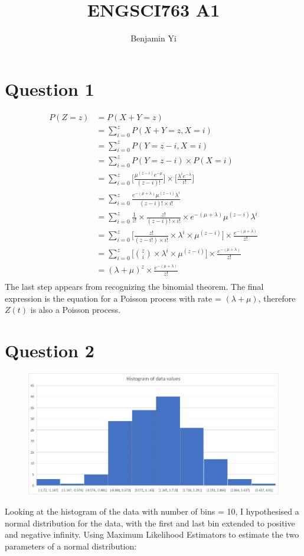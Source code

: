 \documentclass[10pt,a4paper]{article}
\begin{document}
\title{ENGSCI763 A1}
\author{Benjamin Yi}
	
\section*{Question 1}
\begin{align*}
	P(Z=z) &= P(X + Y = z) \\
	&= \sum_{i=0}^{z}P(X + Y = z, X = i) \\
	&= \sum_{i=0}^{z}P(Y = z - i, X = i) \\
	&= \sum_{i=0}^{z}P(Y = z - i) \times P(X = i) \\
	&= \sum_{i=0}^{z}\bigg[\frac{\mu^{(z-i)}e^{-\mu}}{(z-i)!}\bigg]\times\bigg[\frac{\lambda^ie^{-\lambda}}{i!}\bigg]\\
	&= \sum_{i=0}^{z}\frac{e^{-(\mu + \lambda)}\mu^{(z-i)}\lambda^i}{(z-i)!\times i!}\\
	&= \sum_{i=0}^{z}\frac{1}{z!}\times\frac{z!}{(z-i)!\times i!}\times e^{-(\mu + \lambda)}\mu^{(z-i)}\lambda^i\\
	&= \sum_{i=0}^{z}\bigg[\frac{z!}{(z-i!)\times i!} \times \lambda^i \times \mu^{(z-i)}\bigg] \times \frac{e^{-(\mu + \lambda)}}{z!}\\
	&= \sum_{i=0}^{z} \bigg[{z \choose i} \times \lambda^i \times \mu^{(z-i)}\bigg] \times \frac{e^{-(\mu + \lambda)}}{z!}\\
	&= (\lambda + \mu)^z \times \frac{e^{-(\mu + \lambda)}}{z!}\\
\end{align*}
The last step appears from recognizing the binomial theorem. The final expression is the equation for a Poisson process with rate = \((\lambda + \mu)\), therefore \(Z(t)\) is also a Poisson process.

\newpage
\section*{Question 2}
\begin{figure}[H]
	\centering
	\includegraphics[width=0.7\linewidth]{q2hist}
\end{figure}
Looking at the histogram of the data with number of bins = 10, I hypothesised a normal distribution for the data, with the first and last bin extended to positive and negative infinity. Using Maximum Likelihood Estimators to estimate the two parameters of a normal distribution:
\end{document}
